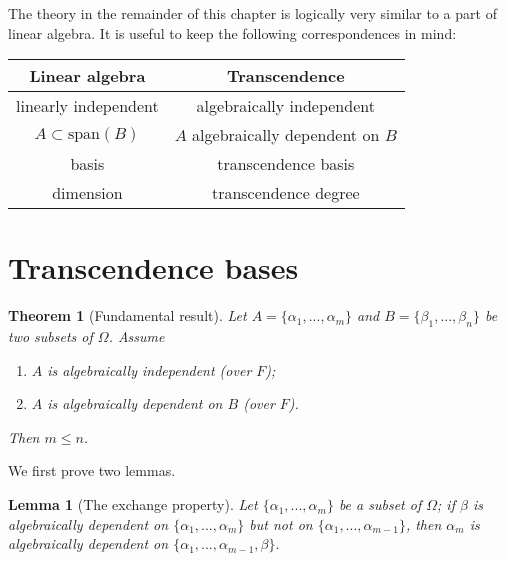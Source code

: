 \documentclass[a4paper,11pt,final,openany]{memoir}
\newtheorem{lemma}[X]{Lemma}
\newtheorem{theorem}[X]{Theorem}
\theoremstyle{nonumberplain}
\begin{document}
The theory in the remainder of this chapter is logically very similar to a
part of linear algebra. It is useful to keep the following correspondences in
mind:\hfill

\begin{center}%
\begin{tabular}
[c]{|c|c|}\hline
Linear algebra & Transcendence\\\hline
linearly independent & algebraically independent\\\hline
$A\subset\text{span}(B)$ & $A$ algebraically dependent on $B$\\\hline
basis & transcendence basis\\\hline
dimension & transcendence degree\\\hline
\end{tabular}



\end{center}

\section{Transcendence bases}

\begin{theorem}
[Fundamental result]\label{te3} Let $A=\{\alpha_{1},...,\alpha_{m}\}$ and
$B=\{\beta_{1},...,\beta_{n}\}$ be two subsets of $\Omega$. Assume

\begin{enumerate}
\item $A$ is algebraically independent (over $F$);

\item $A$ is algebraically dependent on $B$ (over $F$).
\end{enumerate}

\noindent Then $m\leq n$.
\end{theorem}

We first prove two lemmas.

\begin{lemma}
[The exchange property]\label{te4}Let $\{\alpha_{1},...,\alpha_{m}\}$ be a
subset of $\Omega$; if $\beta$ is algebraically dependent on $\{\alpha
_{1},...,\alpha_{m}\}$ but not on $\{\alpha_{1},...,\alpha_{m-1}\}$, then
$\alpha_{m}$ is algebraically dependent on $\{\alpha_{1},...,\alpha
_{m-1},\beta\}.$
\end{lemma}
\end{document}
